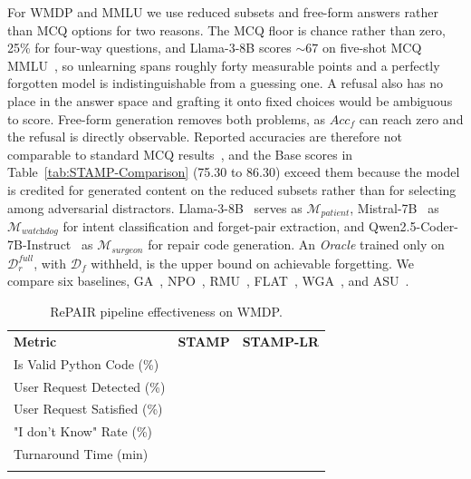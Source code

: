 For WMDP and MMLU we use reduced subsets and free-form answers rather than MCQ options for two reasons. The MCQ floor is chance rather than zero, 25\% for four-way questions, and Llama-3-8B scores ${\sim}67$ on five-shot MCQ MMLU~\cite{grattafiori2024llama}, so unlearning spans roughly forty measurable points and a perfectly forgotten model is indistinguishable from a guessing one. A refusal also has no place in the answer space and grafting it onto fixed choices would be ambiguous to score. Free-form generation removes both problems, as $Acc_f$ can reach zero and the refusal is directly observable. Reported accuracies are therefore not comparable to standard MCQ results~\cite{grattafiori2024llama}, and the Base scores in Table~\ref{tab:STAMP-Comparison} (75.30 to 86.30) exceed them because the model is credited for generated content on the reduced subsets rather than for selecting among adversarial distractors. Llama-3-8B~\cite{grattafiori2024llama} serves as $\mathcal{M}_{\textit{patient}}$, Mistral-7B~\cite{Jiang2023Mistral7} as $\mathcal{M}_{\textit{watchdog}}$ for intent classification and forget-pair extraction, and Qwen2.5-Coder-7B-Instruct~\cite{hui2024qwen2} as $\mathcal{M}_{\textit{surgeon}}$ for repair code generation. An \textit{Oracle} trained only on $\mathcal{D}_r^{\textit{full}}$, with $\mathcal{D}_f$ withheld, is the upper bound on achievable forgetting. We compare six baselines, GA~\cite{yao2024large}, NPO~\cite{zhang2024negative}, RMU~\cite{li2024wmdp}, FLAT~\cite{wang2024llm}, WGA~\cite{wang2025rethinking}, and ASU~\cite{zade2026attention}.
\begin{table}[h!]
\centering
\caption{RePAIR pipeline effectiveness on WMDP.}
\label{tab:decomposition}
\renewcommand{\arraystretch}{1.25}
\begin{tabularx}{\columnwidth}{l|>{\centering\arraybackslash}X>{\centering\arraybackslash}X}
\Xhline{1.15pt}
\textbf{Metric} & \textbf{STAMP} & \textbf{STAMP-LR} \\
\Xhline{1.15pt}
Is Valid Python Code (\%)       & 97.23 & 96.27 \\
\rowcolor{gray!15}
User Request Detected (\%)      & 96.30 & 97.50 \\
User Request Satisfied (\%)     & 98.90 & 97.70 \\
\rowcolor{gray!15}
"I don't Know" Rate (\%)                  & 98.27 & 96.27 \\
Turnaround Time (min)          & 9.36  & 6.50  \\
\Xhline{1.15pt}
\end{tabularx}
\end{table}

